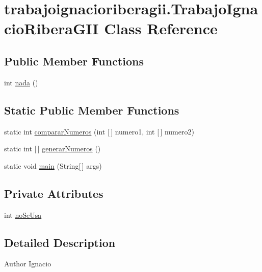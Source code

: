 \hypertarget{classtrabajoignacioriberagii_1_1_trabajo_ignacio_ribera_g_i_i}{}\section{trabajoignacioriberagii.\+Trabajo\+Ignacio\+Ribera\+G\+II Class Reference}
\label{classtrabajoignacioriberagii_1_1_trabajo_ignacio_ribera_g_i_i}
\subsection*{Public Member Functions}
\begin{DoxyCompactItemize}
\item 
int \mbox{\hyperlink{classtrabajoignacioriberagii_1_1_trabajo_ignacio_ribera_g_i_i_a426bae568b1ab10ba20f9a2c0ed09a46}{nada}} ()
\end{DoxyCompactItemize}
\subsection*{Static Public Member Functions}
\begin{DoxyCompactItemize}
\item 
static int \mbox{\hyperlink{classtrabajoignacioriberagii_1_1_trabajo_ignacio_ribera_g_i_i_afd0cbbbade0a2b770ea10a9fc69c0608}{comparar\+Numeros}} (int \mbox{[}$\,$\mbox{]} numero1, int \mbox{[}$\,$\mbox{]} numero2)
\item 
static int \mbox{[}$\,$\mbox{]} \mbox{\hyperlink{classtrabajoignacioriberagii_1_1_trabajo_ignacio_ribera_g_i_i_a3ebb16ff889f09eecc47a959b7f33a54}{generar\+Numeros}} ()
\item 
static void \mbox{\hyperlink{classtrabajoignacioriberagii_1_1_trabajo_ignacio_ribera_g_i_i_a19df64b4b484ec115a402f5b1c4430ef}{main}} (String\mbox{[}$\,$\mbox{]} args)
\end{DoxyCompactItemize}
\subsection*{Private Attributes}
\begin{DoxyCompactItemize}
\item 
int \mbox{\hyperlink{classtrabajoignacioriberagii_1_1_trabajo_ignacio_ribera_g_i_i_ae8c0f50fdeac8c88cfed579b6fa41fd6}{no\+Se\+Usa}}
\end{DoxyCompactItemize}


\subsection{Detailed Description}
\begin{DoxyAuthor}{Author}
Ignacio 
\end{DoxyAuthor}



